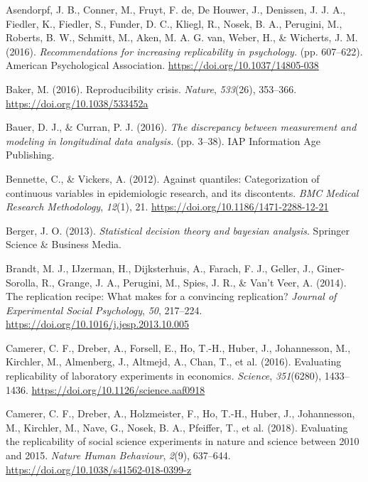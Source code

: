 \documentclass[
]{interact}
\newlength{\cslhangindent}
\newlength{\cslentryspacingunit} %
\newenvironment{CSLReferences}[2] %
 {%
  \setlength{\parindent}{0pt}
  \ifodd #1
  \let\oldpar\par
  \def\par{\hangindent=\cslhangindent\oldpar}
  \fi
  \setlength{\parskip}{#2\cslentryspacingunit}
 }%
 {}
\begin{document}
\hypertarget{refs}{}
\begin{CSLReferences}{1}{0}
\leavevmode{}%
Asendorpf, J. B., Conner, M., Fruyt, F. de, De Houwer, J., Denissen, J.
J. A., Fiedler, K., Fiedler, S., Funder, D. C., Kliegl, R., Nosek, B.
A., Perugini, M., Roberts, B. W., Schmitt, M., Aken, M. A. G. van,
Weber, H., \& Wicherts, J. M. (2016). \emph{Recommendations for
increasing replicability in psychology.} (pp. 607--622). American
Psychological Association. \url{https://doi.org/10.1037/14805-038}

\leavevmode{}%
Baker, M. (2016). Reproducibility crisis. \emph{Nature}, \emph{533}(26),
353--366. \url{https://doi.org/10.1038/533452a}

\leavevmode{}%
Bauer, D. J., \& Curran, P. J. (2016). \emph{The discrepancy between
measurement and modeling in longitudinal data analysis.} (pp. 3--38).
IAP Information Age Publishing.

\leavevmode{}%
Bennette, C., \& Vickers, A. (2012). Against quantiles: Categorization
of continuous variables in epidemiologic research, and its discontents.
\emph{BMC Medical Research Methodology}, \emph{12}(1), 21.
\url{https://doi.org/10.1186/1471-2288-12-21}

\leavevmode{}%
Berger, J. O. (2013). \emph{Statistical decision theory and bayesian
analysis}. Springer Science \& Business Media.

\leavevmode{}%
Brandt, M. J., IJzerman, H., Dijksterhuis, A., Farach, F. J., Geller,
J., Giner-Sorolla, R., Grange, J. A., Perugini, M., Spies, J. R., \&
Van't Veer, A. (2014). The replication recipe: What makes for a
convincing replication? \emph{Journal of Experimental Social
Psychology}, \emph{50}, 217--224.
\url{https://doi.org/10.1016/j.jesp.2013.10.005}

\leavevmode{}%
Camerer, C. F., Dreber, A., Forsell, E., Ho, T.-H., Huber, J.,
Johannesson, M., Kirchler, M., Almenberg, J., Altmejd, A., Chan, T., et
al. (2016). Evaluating replicability of laboratory experiments in
economics. \emph{Science}, \emph{351}(6280), 1433--1436.
\url{https://doi.org/10.1126/science.aaf0918}

\leavevmode{}%
Camerer, C. F., Dreber, A., Holzmeister, F., Ho, T.-H., Huber, J.,
Johannesson, M., Kirchler, M., Nave, G., Nosek, B. A., Pfeiffer, T., et
al. (2018). Evaluating the replicability of social science experiments
in nature and science between 2010 and 2015. \emph{Nature Human
Behaviour}, \emph{2}(9), 637--644.
\url{https://doi.org/10.1038/s41562-018-0399-z}


\end{CSLReferences}
\end{document}

